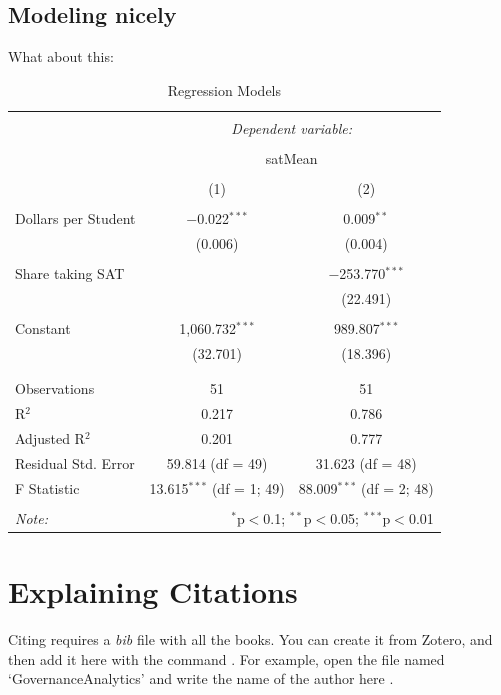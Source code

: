 \documentclass[11pt]{article}
\begin{document}
\subsection{Modeling nicely}\label{modelnice}

What about this:

\begin{table}[!htbp] \centering 
  \caption{Regression Models} 
  \label{regmods} 
\begin{tabular}{@{\extracolsep{5pt}}lcc} 
\\[-1.8ex]\hline 
\hline \\[-1.8ex] 
 & \multicolumn{2}{c}{\textit{Dependent variable:}} \\ 
\cline{2-3} 
\\[-1.8ex] & \multicolumn{2}{c}{satMean} \\ 
\\[-1.8ex] & (1) & (2)\\ 
\hline \\[-1.8ex] 
 Dollars per Student & $-$0.022$^{***}$ & 0.009$^{**}$ \\ 
  & (0.006) & (0.004) \\ 
  & & \\ 
 Share taking SAT &  & $-$253.770$^{***}$ \\ 
  &  & (22.491) \\ 
  & & \\ 
 Constant & 1,060.732$^{***}$ & 989.807$^{***}$ \\ 
  & (32.701) & (18.396) \\ 
  & & \\ 
\hline \\[-1.8ex] 
Observations & 51 & 51 \\ 
R$^{2}$ & 0.217 & 0.786 \\ 
Adjusted R$^{2}$ & 0.201 & 0.777 \\ 
Residual Std. Error & 59.814 (df = 49) & 31.623 (df = 48) \\ 
F Statistic & 13.615$^{***}$ (df = 1; 49) & 88.009$^{***}$ (df = 2; 48) \\ 
\hline 
\hline \\[-1.8ex] 
\textit{Note:}  & \multicolumn{2}{r}{$^{*}$p$<$0.1; $^{**}$p$<$0.05; $^{***}$p$<$0.01} \\ 
\end{tabular} 
\end{table} 
\clearpage

\section{Explaining Citations}\label{citation}


Citing requires a \emph{bib} file with all the books. You can create it from Zotero, and then add it here with the command \cite{heath_switch:_2010}. For example, open the file named `GovernanceAnalytics' and write the name of the author here \cite{magallanes_reyes_introducing_2017}.


 
\end{document}
